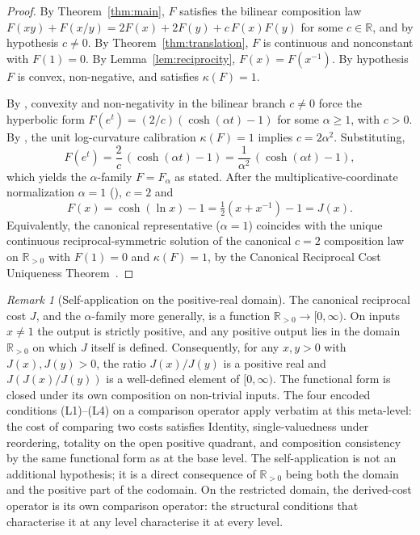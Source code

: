 \documentclass[11pt,a4paper]{article}
\theoremstyle{definition}
\theoremstyle{remark}
\newtheorem{remark}[theorem]{Remark}
\begin{document}
\begin{proof}
By Theorem~\ref{thm:main}, $F$ satisfies the bilinear composition law
$F(xy) + F(x/y) = 2F(x) + 2F(y) + c\,F(x) F(y)$ for some $c \in \mathbb{R}$,
and by hypothesis $c \neq 0$. By Theorem~\ref{thm:translation}, $F$ is
continuous and nonconstant with $F(1) = 0$. By
Lemma~\ref{lem:reciprocity}, $F(x) = F(x^{-1})$. By hypothesis $F$ is
convex, non-negative, and satisfies $\kappa(F) = 1$.

By
\cite[Corollary~8]{WashburnZlatanovicAllahyarov2026}, convexity and
non-negativity in the bilinear branch $c \neq 0$ force the hyperbolic
form $F(e^t) = (2/c)(\cosh(\alpha t) - 1)$ for some $\alpha \geq 1$,
with $c > 0$. By \cite[Theorem~9]{WashburnZlatanovicAllahyarov2026},
the unit log-curvature calibration $\kappa(F) = 1$ implies
$c = 2\alpha^2$. Substituting,
\[
F(e^t) = \frac{2}{c}\,(\cosh(\alpha t) - 1)
       = \frac{1}{\alpha^2}\,(\cosh(\alpha t) - 1),
\]
which yields the $\alpha$-family $F = F_\alpha$ as stated. After the
multiplicative-coordinate normalization $\alpha = 1$
(\cite[Corollary~10]{WashburnZlatanovicAllahyarov2026}), $c = 2$ and
\[
F(x) = \cosh(\ln x) - 1
     = \tfrac{1}{2}(x + x^{-1}) - 1
     = J(x).
\]
Equivalently, the canonical representative ($\alpha = 1$) coincides
with the unique continuous reciprocal-symmetric solution of the
canonical $c = 2$ composition law on $\mathbb{R}_{>0}$ with $F(1) = 0$
and $\kappa(F) = 1$, by the Canonical Reciprocal Cost Uniqueness
Theorem~\cite[Theorem~1]{WashburnZlatanovic2026}.
\end{proof}

\begin{remark}[Self-application on the positive-real domain]
\label{rem:self-application}
The canonical reciprocal cost $J$, and the $\alpha$-family more
generally, is a function $\mathbb{R}_{>0} \to [0, \infty)$. On inputs
$x \neq 1$ the output is strictly positive, and any positive output
lies in the domain $\mathbb{R}_{>0}$ on which $J$ itself is defined.
Consequently, for any $x, y > 0$ with $J(x), J(y) > 0$, the ratio
$J(x)/J(y)$ is a positive real and $J(J(x)/J(y))$ is a well-defined
element of $[0, \infty)$. The functional form is closed under its own
composition on non-trivial inputs. The four encoded conditions
(L1)--(L4) on a comparison operator apply verbatim at this meta-level:
the cost of comparing two costs satisfies Identity, single-valuedness
under reordering, totality on the open positive quadrant, and
composition consistency by the same functional form as at the base
level. The self-application is not an additional hypothesis; it is a
direct consequence of $\mathbb{R}_{>0}$ being both the domain and the
positive part of the codomain. On the restricted domain, the
derived-cost operator is its own comparison operator: the structural
conditions that characterise it at any level characterise it at every
level.
\end{remark}
\end{document}

